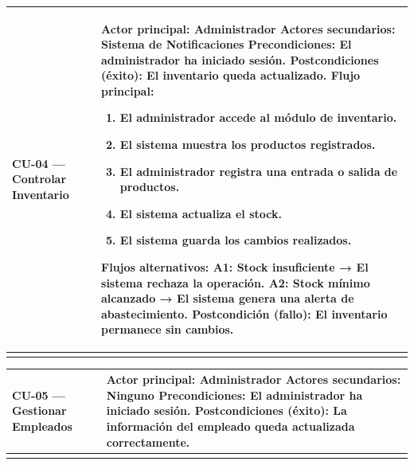 \documentclass[
]{article}
\newcounter{none} %
\begin{document}
{\def\LTcaptype{none} %
\begin{longtable}[]{@{}
  >{\raggedright\arraybackslash}p{}
  >{\raggedright\arraybackslash}p{}@{}}
\toprule\noalign{}
\begin{minipage}[b]{\linewidth}\raggedright
CU-04 --- Controlar Inventario
\end{minipage} & \begin{minipage}[b]{\linewidth}\raggedright
\textbf{Actor principal:} Administrador \textbf{Actores secundarios:}
Sistema de Notificaciones \textbf{Precondiciones:} El administrador ha iniciado sesión. \textbf{Postcondiciones (éxito):} El inventario queda actualizado. \textbf{Flujo principal:}

\begin{enumerate}
\def\labelenumi{\arabic{enumi}.}
\item
  El administrador accede al módulo de inventario.
\item
  El sistema muestra los productos registrados.
\item
  El administrador registra una entrada o salida de productos.
\item
  El sistema actualiza el stock.
\item
  El sistema guarda los cambios realizados.
\end{enumerate}

\textbf{Flujos alternativos:} A1: Stock insuficiente → El sistema rechaza la operación. A2: Stock mínimo alcanzado → El sistema genera una alerta de
abastecimiento. Postcondición (fallo): El inventario permanece sin cambios.
\end{minipage} \\
\midrule\noalign{}
\endhead
\bottomrule\noalign{}
\endlastfoot
\end{longtable}
}

{\def\LTcaptype{none} %
\begin{longtable}[]{@{}
  >{\raggedright\arraybackslash}p{}
  >{\raggedright\arraybackslash}p{}@{}}
\toprule\noalign{}
\begin{minipage}[b]{\linewidth}\raggedright
CU-05 --- Gestionar Empleados
\end{minipage} & \begin{minipage}[b]{\linewidth}\raggedright
\textbf{Actor principal:} Administrador \textbf{Actores secundarios:}
Ninguno \textbf{Precondiciones:} El administrador ha iniciado sesión. \textbf{Postcondiciones (éxito):} La información del empleado queda
actualizada correctamente.
\end{minipage} \\
\midrule\noalign{}
\endhead
\bottomrule\noalign{}
\endlastfoot
\end{longtable}
}
\end{document}
